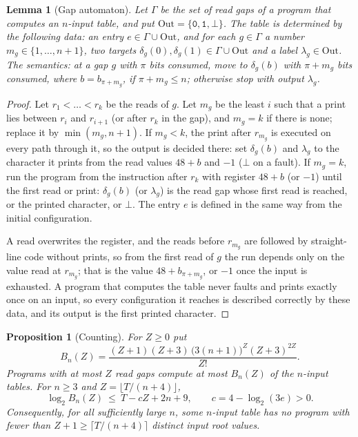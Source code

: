 \documentclass[11pt]{article}
\newtheorem{lemma}[theorem]{Lemma}
\newtheorem{proposition}[theorem]{Proposition}
\theoremstyle{remark}
\begin{document}
\begin{lemma}[Gap automaton]\label{lem:gapauto}
Let $\Gamma$ be the set of read gaps of a program that computes an
$n$-input table, and put $\mathrm{Out}=\{\mathtt0,\mathtt1,\bot\}$.  The table
is determined by the following data: an entry $e\in\Gamma\cup\mathrm{Out}$,
and for each $g\in\Gamma$ a number $m_g\in\{1,\dots,n+1\}$, two targets
$\delta_g(0),\delta_g(1)\in\Gamma\cup\mathrm{Out}$ and a label
$\lambda_g\in\mathrm{Out}$.  The semantics: at a gap $g$ with $\pi$ bits
consumed, move to $\delta_g(b)$ with $\pi+m_g$ bits consumed, where
$b=b_{\pi+m_g}$, if $\pi+m_g\le n$; otherwise stop with output $\lambda_g$.
\end{lemma}

\begin{proof}
Let $r_1<\dots<r_k$ be the reads of $g$.  Let $m_g$ be the least $i$ such
that a print lies between $r_i$ and $r_{i+1}$ (or after $r_k$ in the gap), and
$m_g=k$ if there is none; replace it by $\min(m_g,n+1)$.  If $m_g<k$, the
print after $r_{m_g}$ is executed on every path through it, so the output is
decided there: set $\delta_g(b)$ and $\lambda_g$ to the character it prints
from the read values $48+b$ and $-1$ ($\bot$ on a fault).  If $m_g=k$, run
the program from the instruction after $r_k$ with register $48+b$ (or $-1$)
until the first read or print: $\delta_g(b)$ (or $\lambda_g$) is the read
gap whose first read is reached, or the printed character, or $\bot$.  The
entry $e$ is defined in the same way from the initial configuration.

A read overwrites the register, and the reads before $r_{m_g}$ are followed
by straight-line code without prints, so from the first read of $g$ the run
depends only on the value read at $r_{m_g}$; that is the value
$48+b_{\pi+m_g}$, or $-1$ once the input is exhausted.  A program that
computes the table never faults and prints exactly once on an input, so
every configuration it reaches is described correctly by these data, and
its output is the first printed character.
\end{proof}


\begin{proposition}[Counting]\label{prop:counting}
For $Z\ge0$ put
\[
  B_n(Z)=\frac{(Z+1)(Z+3)\,\bigl(3(n+1)\bigr)^Z(Z+3)^{2Z}}{Z!}.
\]
Programs with at most $Z$ read gaps compute at most $B_n(Z)$ of the
$n$-input tables.  For $n\ge3$ and $Z=\lfloor T/(n+4)\rfloor$,
\[
  \log_2B_n(Z)\ \le\ T-cZ+2n+9,\qquad c=4-\log_2(3e)>0 .
\]
Consequently, for all sufficiently large $n$, some $n$-input table has no
program with fewer than $Z+1\ge\lceil T/(n+4)\rceil$ distinct input root
values.
\end{proposition}
\end{document}
